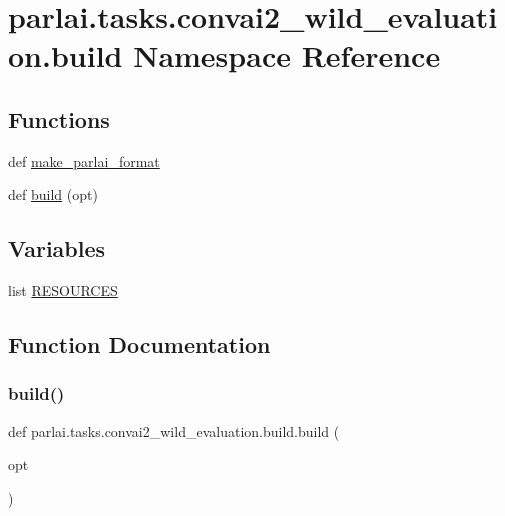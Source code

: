 \hypertarget{namespaceparlai_1_1tasks_1_1convai2__wild__evaluation_1_1build}{}\section{parlai.\+tasks.\+convai2\+\_\+wild\+\_\+evaluation.\+build Namespace Reference}
\label{namespaceparlai_1_1tasks_1_1convai2__wild__evaluation_1_1build}
\subsection*{Functions}
\begin{DoxyCompactItemize}
\item 
def \hyperlink{namespaceparlai_1_1tasks_1_1convai2__wild__evaluation_1_1build_a6c2b84806e2cb18c6eedb72d161dec5e}{make\+\_\+parlai\+\_\+format}
\item 
def \hyperlink{namespaceparlai_1_1tasks_1_1convai2__wild__evaluation_1_1build_a7f46320f8766498ee5f87f68e24da31b}{build} (opt)
\end{DoxyCompactItemize}
\subsection*{Variables}
\begin{DoxyCompactItemize}
\item 
list \hyperlink{namespaceparlai_1_1tasks_1_1convai2__wild__evaluation_1_1build_abdb1e0f90d76cfd525e4ef8f8e610839}{R\+E\+S\+O\+U\+R\+C\+ES}
\end{DoxyCompactItemize}


\subsection{Function Documentation}
\mbox{\label{namespaceparlai_1_1tasks_1_1convai2__wild__evaluation_1_1build_a7f46320f8766498ee5f87f68e24da31b}} 
\subsubsection{\texorpdfstring{build()}{build()}}
{\footnotesize\ttfamily def parlai.\+tasks.\+convai2\+\_\+wild\+\_\+evaluation.\+build.\+build (\begin{DoxyParamCaption}\item[{}]{opt }\end{DoxyParamCaption})}




